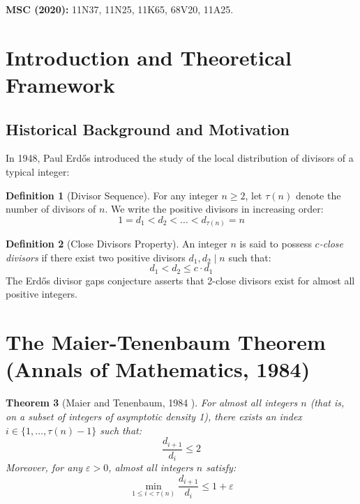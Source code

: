 \documentclass[11pt,a4paper]{article}
\newtheorem{theorem}{Theorem}[section]
\theoremstyle{definition}
\newtheorem{definition}[theorem]{Definition}
\begin{document}
\noindent\textbf{MSC (2020):} 11N37, 11N25, 11K65, 68V20, 11A25.

\tableofcontents
\newpage

\section{Introduction and Theoretical Framework}

\subsection{Historical Background and Motivation}
In 1948, Paul Erd\H{o}s \cite{erdos1948} introduced the study of the local distribution of divisors of a typical integer:

\begin{definition}[Divisor Sequence]\label{def:divisor_seq}
For any integer $n \ge 2$, let $\tau(n)$ denote the number of divisors of $n$.
We write the positive divisors in increasing order:
\begin{equation}\label{eq:ordered_divisors}
1 = d_1 < d_2 < \dots < d_{\tau(n)} = n
\end{equation}
\end{definition}

\begin{definition}[Close Divisors Property]\label{def:close_divisors}
An integer $n$ is said to possess \emph{$c$-close divisors} if there exist two positive divisors $d_1, d_2 \mid n$ such that:
\begin{equation}\label{eq:close_def}
d_1 < d_2 \le c \cdot d_1
\end{equation}
The Erd\H{o}s divisor gaps conjecture asserts that 2-close divisors exist for almost all positive integers.
\end{definition}

\section{The Maier-Tenenbaum Theorem (Annals of Mathematics, 1984)}

\begin{theorem}[Maier and Tenenbaum, 1984 \cite{maier1984}]\label{thm:maier_tenenbaum}
For almost all integers $n$ (that is, on a subset of integers of asymptotic density 1), there exists an index $i \in \{1, \dots, \tau(n) - 1\}$ such that:
\begin{equation}\label{eq:maier_bound}
\frac{d_{i+1}}{d_i} \le 2
\end{equation}
Moreover, for any $\varepsilon > 0$, almost all integers $n$ satisfy:
\begin{equation}\label{eq:maier_epsilon}
\min_{1 \le i < \tau(n)} \frac{d_{i+1}}{d_i} \le 1 + \varepsilon
\end{equation}
\end{theorem}
\end{document}
